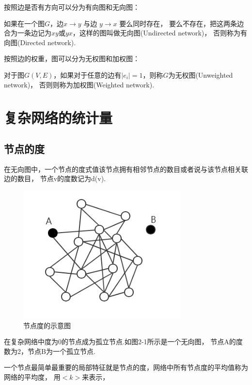 \documentclass[bachelor,adobefonts]{jnuthesis}
\begin{document}
按照边是否有方向可以分为有向图和无向图：

\begin{definition}  
  如果在一个图$G$，边$x \rightarrow y$ 与边 $y \rightarrow x$ 要么同时存在，
  要么不存在，把这两条边合为一条边记为$xy$或$yx$，这样的图叫做无向图(Undirected network)，
  否则称为有向图(Directed network).
\end{definition} 

按照边的权重，图可以分为无权图和加权图：

\begin{definition}  
  对于图$G(V,E)$，如果对于任意的边有$|e_i| = 1$，则称$G$为无权图(Unweighted network)，
  否则则称为加权图(Weighted network).
\end{definition} 


\section{复杂网络的统计量}
\subsection{节点的度}
\begin{definition}
  在无向图中，一个节点的度式值该节点拥有相邻节点的数目或者说与该节点相关联边的数目，
  节点v的度数记为d(v).
\end{definition}


\begin{figure}[h!]
  \centering
  \includegraphics[width=0.6\linewidth]{Wwuxiangtu.png}
  \caption{节点度的示意图}
\end{figure}

在复杂网络中度为0的节点成为孤立节点.如图2-1所示是一个无向图，
节点A的度数为2，节点B为一个孤立节点.

一个节点最简单最重要的局部特征就是节点的度，网络中所有节点度的平均值称为网络的平均度，
用$<k>$来表示， 
\end{document}
